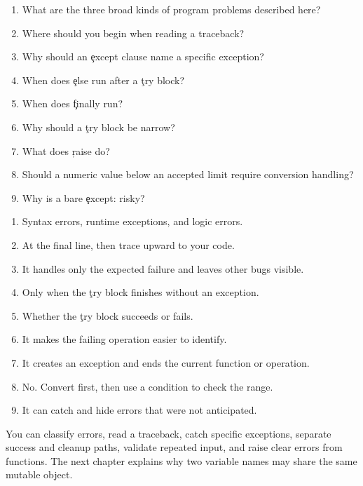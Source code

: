 
\begin{enumerate}
    \item What are the three broad kinds of program problems described here?
    \item Where should you begin when reading a traceback?
    \item Why should an \c{except} clause name a specific exception?
    \item When does \c{else} run after a \c{try} block?
    \item When does \c{finally} run?
    \item Why should a \c{try} block be narrow?
    \item What does \c{raise} do?
    \item Should a numeric value below an accepted limit require conversion handling?
    \item Why is a bare \c{except:} risky?
\end{enumerate}


\begin{enumerate}
    \item Syntax errors, runtime exceptions, and logic errors.
    \item At the final line, then trace upward to your code.
    \item It handles only the expected failure and leaves other bugs visible.
    \item Only when the \c{try} block finishes without an exception.
    \item Whether the \c{try} block succeeds or fails.
    \item It makes the failing operation easier to identify.
    \item It creates an exception and ends the current function or operation.
    \item No. Convert first, then use a condition to check the range.
    \item It can catch and hide errors that were not anticipated.
\end{enumerate}

\begin{tcolorbox}[title=Chapter summary,colframe=orange,colback=white,arc=2mm]
You can classify errors, read a traceback, catch specific exceptions, separate
success and cleanup paths, validate repeated input, and raise clear errors from
functions. The next chapter explains why two variable names may share the same
mutable object.
\end{tcolorbox}

